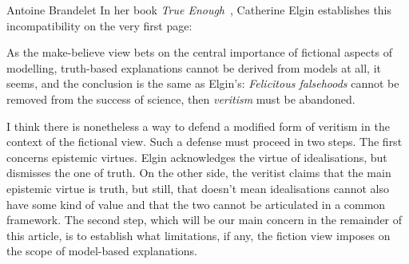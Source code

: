 \begin{artengenv}{Antoine Brandelet}
In her book \textit{True Enough}~\parencite*{Elgin2017}, Catherine Elgin establishes this incompatibility on the very first page: 


As the make-believe view bets on the central importance of fictional aspects of modelling, truth-based explanations cannot be derived from models at all, it seems, and the conclusion is the same as Elgin's: \textit{Felicitous falsehoods} cannot be removed from the success of science, then \textit{veritism} must be abandoned.

I think there is nonetheless a way to defend a modified form of veritism in the context of the fictional view. Such a defense must proceed in two steps. The first concerns epistemic virtues. Elgin acknowledges the virtue of idealisations, but dismisses the one of truth. On the other side, the veritist claims that the main epistemic virtue is truth, but still, that doesn't mean idealisations cannot also have some kind of value and that the two cannot be articulated in a common framework. The second step, which will be our main concern in the remainder of this article, is to establish what limitations, if any, the fiction view imposes on the scope of model-based explanations.


\end{artengenv}
